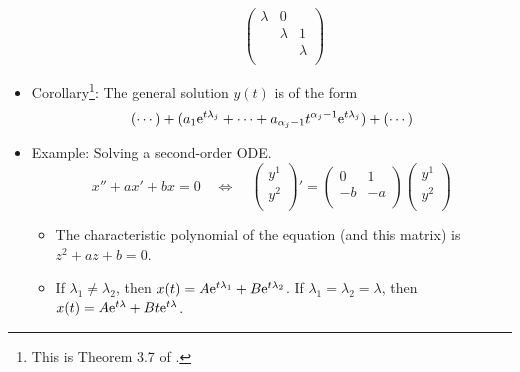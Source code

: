 \documentclass[../notes.tex]{subfiles}
\begin{document}
\begin{itemize}
\begin{itemize}
        \begin{equation*}
            \begin{pmatrix}
                \lambda & 0 & \\
                 & \lambda & 1\\
                 &  & \lambda\\
            \end{pmatrix}
        \end{equation*}
    \end{itemize}
    \item Corollary\footnote{This is Theorem 3.7 of \textcite{bib:Teschl}.}: The general solution $y(t)$ is of the form
    \begin{equation*}
        (\cdots)+(a_1\e[t\lambda_j]+\cdots+a_{\alpha_j-1}t^{\alpha_j-1}\e[t\lambda_j])+(\cdots)
    \end{equation*}
    \item Example: Solving a second-order ODE.
    \begin{equation*}
        x''+ax'+bx = 0
        \quad\Longleftrightarrow\quad
        \begin{pmatrix}
            y^1\\
            y^2\\
        \end{pmatrix}'
        =
        \begin{pmatrix}
            0 & 1\\
            -b & -a\\
        \end{pmatrix}
        \begin{pmatrix}
            y^1\\
            y^2\\
        \end{pmatrix}
    \end{equation*}
    \begin{itemize}
        \item The characteristic polynomial of the equation (and this matrix) is $z^2+az+b=0$.
        \item If $\lambda_1\neq\lambda_2$, then $x(t)=A\e[t\lambda_1]+B\e[t\lambda_2]$. If $\lambda_1=\lambda_2=\lambda$, then $x(t)=A\e[t\lambda]+Bt\e[t\lambda]$.
    \end{itemize}
\end{itemize}
\end{document}
